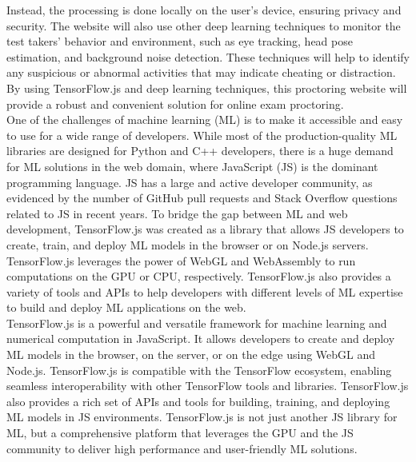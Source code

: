 \documentclass[journal]{IEEEtran}
\begin{document}
Instead, the processing is done locally on the user's device, ensuring privacy and security. The website will also use other deep learning techniques to monitor the test takers' behavior and environment, such as eye tracking, head pose estimation, and background noise detection. These techniques will help to identify any suspicious or abnormal activities that may indicate cheating or distraction. By using TensorFlow.js and deep learning techniques, this proctoring website will provide a robust and convenient solution for online exam proctoring.\\


One of the challenges of machine learning (ML) is to make it accessible and easy to use for a wide range of developers. While most of the production-quality ML libraries are designed for Python and C++ developers, there is a huge demand for ML solutions in the web domain, where JavaScript (JS) is the dominant programming language. JS has a large and active developer community, as evidenced by the number of GitHub pull requests and Stack Overflow questions related to JS in recent years. To bridge the gap between ML and web development, TensorFlow.js was created as a library that allows JS developers to create, train, and deploy ML models in the browser or on Node.js servers. TensorFlow.js leverages the power of WebGL and WebAssembly to run computations on the GPU or CPU, respectively. TensorFlow.js also provides a variety of tools and APIs to help developers with different levels of ML expertise to build and deploy ML applications on the web.\\

TensorFlow.js is a powerful and versatile framework for machine learning and numerical computation in JavaScript. It allows developers to create and deploy ML models in the browser, on the server, or on the edge using WebGL and Node.js. TensorFlow.js is compatible with the TensorFlow ecosystem, enabling seamless interoperability with other TensorFlow tools and libraries. TensorFlow.js also provides a rich set of APIs and tools for building, training, and deploying ML models in JS environments. TensorFlow.js is not just another JS library for ML, but a comprehensive platform that leverages the GPU and the JS community to deliver high performance and user-friendly ML solutions.\\
\end{document}
